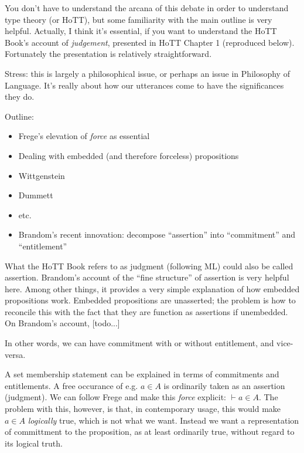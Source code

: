 You don't have to understand the arcana of this debate in order to
understand type theory (or HoTT), but some familiarity with the main
outline is very helpful.  Actually, I think it's essential, if you
want to understand the HoTT Book's account of \textit{judgement},
presented in HoTT Chapter 1 (reproduced below).  Fortunately the
presentation is relatively straightforward.

\begin{remark}
  Stress: this is largely a philosophical issue, or perhaps an issue
  in Philosophy of Language.  It's really about how our utterances
  come to have the significances they do.
\end{remark}

Outline:

\begin{itemize}
\item Frege's elevation of \textit{force} as essential
\item Dealing with embedded (and therefore forceless) propositions
\item Wittgenstein
\item Dummett
\item etc.
\item Brandom's recent innovation: decompose ``assertion'' into ``commitment'' and ``entitlement''
\end{itemize}

What the HoTT Book refers to as judgment (following ML) could also be
called assertion.  Brandom's account of the ``fine structure'' of
assertion is very helpful here.  Among other things, it provides a
very simple explanation of how embedded propositions work.  Embedded
propositions are unasserted; the problem is how to reconcile this with
the fact that they are function as assertions if unembedded.  On
Brandom's account, [todo...]

In other words, we can have commitment with or without entitlement,
and vice-versa.

A set membership statement can be explained in terms of commitments
and entitlements.  A free occurance of e.g. \(a\in A\) is ordinarily
taken as an assertion (judgment).  We can follow Frege and make this
\textit{force} explicit: \(\vdash a\in A\).  The problem with this,
however, is that, in contemporary usage, this would make \(a\in A\)
\textit{logically} true, which is not what we want.  Instead we want a
representation of committment to the proposition, as at least
ordinarily true, without regard to its logical truth.

